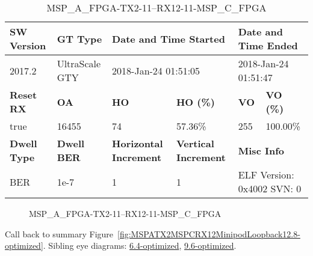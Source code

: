 \begin{table}[h]
\centering
\caption{MSP\_A\_FPGA-TX2-11--RX12-11-MSP\_C\_FPGA}
\label{tab:MSPAFPGATX211RX1211MSPCFPGA12.8-optimized}
\begin{tabular}{@{}|l|l|l|l|l|l|@{}}
\toprule
\textbf{SW Version}                & \textbf{GT Type}   & \multicolumn{2}{l|}{\textbf{Date and Time Started}}            & \multicolumn{2}{l|}{\textbf{Date and Time Ended}}        \\ \midrule
2017.2                       & UltraScale GTY          & \multicolumn{2}{l|}{2018-Jan-24 01:51:05}                   & \multicolumn{2}{l|}{2018-Jan-24 01:51:47}               \\ \midrule
\textbf{Reset RX}                  & \textbf{OA} & \textbf{HO}   & \textbf{HO (\%)} & \textbf{VO} & \textbf{VO (\%)} \\ \midrule
true & 16455        & 74          & 57.36\%        & 255        & 100.00\%       \\ \midrule
\textbf{Dwell Type}                & \textbf{Dwell BER} & \textbf{Horizontal Increment} & \textbf{Vertical Increment}    & \multicolumn{2}{l|}{\textbf{Misc Info}}                  \\ \midrule
BER                            & 1e-7        & 1        & 1           & \multicolumn{2}{l|}{ELF Version: 0x4002 SVN: 0}                         \\ \bottomrule
\end{tabular}
\end{table}

\begin{figure}[h]
\caption{MSP\_A\_FPGA-TX2-11--RX12-11-MSP\_C\_FPGA} \label{fig:MSPAFPGATX211RX1211MSPCFPGA12.8-optimized}
\end{figure}

Call back to summary Figure~\ref{fig:MSPATX2MSPCRX12MinipodLoopback12.8-optimized}.
Sibling eye diagrams: \hyperref[sec:MSPAFPGATX211RX1211MSPCFPGA6.4-optimized]{6.4-optimized}, \hyperref[sec:MSPAFPGATX211RX1211MSPCFPGA9.6-optimized]{9.6-optimized}.

\clearpage
\newpage

